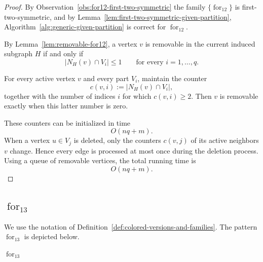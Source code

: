 \documentclass[12pt]{article}
\theoremstyle{plain}
\theoremstyle{definition}
\theoremstyle{remark}
\theoremstyle{definition}
\newcommand{\forlabel}{\mathrm{for}}
\DeclareRobustCommand{\forparam}[1]{%
  \ensuremath{\mathop{\forlabel}\nolimits_{#1}}%
}
\begin{document}
\begin{proof}
By Observation~\ref{obs:for12-first-two-symmetric} the family
\(\{\forparam{12}\}\) is first-two-symmetric, and by
Lemma~\ref{lem:first-two-symmetric-given-partition},
Algorithm~\ref{alg:generic-given-partition} is correct for
\(\forparam{12}\).

By Lemma~\ref{lem:removable-for12}, a vertex \(v\) is removable in the
current induced subgraph \(H\) if and only if
\[
|N_H(v)\cap V_i|\le 1
\qquad
\text{for every }i=1,\dots,q.
\]

For every active vertex \(v\) and every part \(V_i\), maintain the counter
\[
c(v,i):=|N_H(v)\cap V_i|,
\]
together with the number of indices \(i\) for which \(c(v,i)\ge2\).
Then \(v\) is removable exactly when this latter number is zero.

These counters can be initialized in time
\[
O(nq+m).
\]
When a vertex \(u\in V_j\) is deleted, only the counters \(c(v,j)\) of
its active neighbors \(v\) change. Hence every edge is processed at most
once during the deletion process. Using a queue of removable vertices,
the total running time is
\[
O(nq+m).
\]
\end{proof}




\subsection{\texorpdfstring{\(\forparam{13}\)}{for13}}
\label{subsec:for13}

We use the notation of
Definition~\ref{def:colored-versions-and-families}.
The pattern \(\forparam{13}\) is depicted below.

\begin{center}

\smallskip
\(\forparam{13}\)
\end{center}
\end{document}
